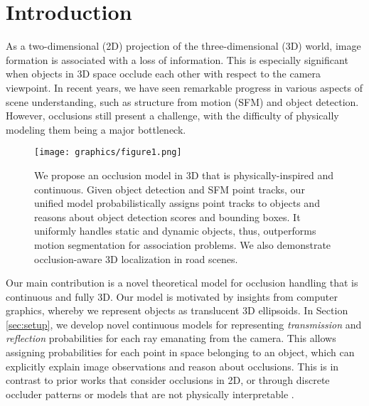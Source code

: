 \section{Introduction}


As a two-dimensional (2D) projection of the three-dimensional (3D) world, image formation is associated with a loss of information. This is especially significant when objects in 3D space occlude each other with respect to the camera viewpoint. In recent years, we have seen remarkable progress in various aspects of scene understanding, such as structure from motion (SFM) and object detection. However, occlusions still present a challenge, with the difficulty of physically modeling them being a major bottleneck. 

\begin{figure}[!!t]
\begin{center}
\texttt{[image: graphics/figure1.png]}
\end{center}
\vspace{-0.6cm}
\caption{\small We propose an occlusion model in 3D that is physically-inspired and continuous. Given object detection and SFM point tracks, our unified model probabilistically assigns point tracks to objects and reasons about object detection scores and bounding boxes. It uniformly handles static and dynamic objects, thus, outperforms motion segmentation for association problems. We also demonstrate occlusion-aware 3D localization in road scenes.}
\label{fig:page1}
\vspace{-0.4cm}
\end{figure}

Our main contribution is a novel theoretical model for occlusion handling that is continuous and fully 3D. Our model is motivated by insights from computer graphics, whereby we represent objects as translucent 3D ellipsoids. In Section \ref{sec:setup}, we develop novel continuous models for representing \emph{transmission} and \emph{reflection} probabilities for each ray emanating from the camera. This allows assigning probabilities for each point in space belonging to an object, which can explicitly explain image observations and reason about occlusions. This is in contrast to prior works that consider occlusions in 2D, or through discrete occluder patterns or models that are not physically interpretable \cite{Hsiao_Herbert_2012,Pepik_etal_2013,Xiang_Savarese_2013,Zia_etal_2013,Zia_etal_2014}.


